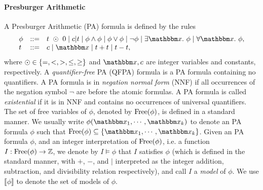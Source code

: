 \paragraph{Presburger Arithmetic} \label{PA}
A Presburger Arithmetic (PA) formula 
 is defined by the rules 
 $$
 \begin{array}{ l c l}
 \phi &::= & t \ \op\ 0 \mid c | t \mid \phi \wedge \phi \mid \phi \vee \phi \mid \neg \phi \mid \exists \ivarx.\ \phi \mid \forall \ivarx.\ \phi,\\
 t &::=& c \mid \ivarx \mid t+t \mid t - t,
 \end{array}
 $$
where $\odot \in \{=, < , >, \le, \ge\}$ and $\ivarx, c$ are integer variables and constants, respectively. A \emph{quantifier-free} PA (QFPA) formula is a PA formula containing no quantifiers. A PA formula is in \emph{negation normal form} (NNF) if all occurrences of the negation symbol $\neg$ are before the atomic formulas. A PA formula is called \emph{existential} if it is in NNF and contains no occurrences of universal quantifiers.
%
The set of free variables of $\phi$, denoted by $\mathrm{Free}(\phi)$, is defined in a standard manner. 
We usually write $\phi(\ivarx_1,\cdots, \ivarx_k)$ to denote an PA formula $\phi$ such that $\free(\phi) \subseteq \{\ivarx_1,\cdots, \ivarx_k\}$. Given an PA formula $\phi$, and an integer interpretation of $\mathrm{Free}(\phi)$, i.e. a function $I: \mathrm{Free}(\phi) \rightarrow \mathbb{Z}$, we denote by $I \models \phi$ that $I$ satisfies $\phi$ (which is defined in the standard manner, with $+$, $-$, and $|$ interpreted as the integer addition, subtraction, and divisibility relation respectively), and call $I$ a \emph{model} of $\phi$. We use $\llbracket \phi \rrbracket$ to denote the set of models of $\phi$. 


